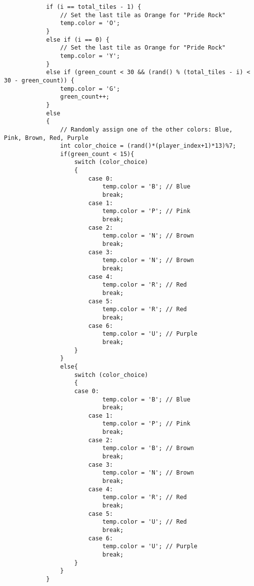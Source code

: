 \documentclass{article}
\begin{document}
\begin{verbatim}
            if (i == total_tiles - 1) {
                // Set the last tile as Orange for "Pride Rock"
                temp.color = 'O';
            } 
            else if (i == 0) {
                // Set the last tile as Orange for "Pride Rock"
                temp.color = 'Y';
            } 
            else if (green_count < 30 && (rand() % (total_tiles - i) < 30 - green_count)) {
                temp.color = 'G';
                green_count++;
            }
            else
            {
                // Randomly assign one of the other colors: Blue, Pink, Brown, Red, Purple
                int color_choice = (rand()*(player_index+1)*13)%7;
                if(green_count < 15){
                    switch (color_choice)
                    {
                        case 0:
                            temp.color = 'B'; // Blue
                            break;
                        case 1:
                            temp.color = 'P'; // Pink
                            break;
                        case 2:
                            temp.color = 'N'; // Brown
                            break;
                        case 3:
                            temp.color = 'N'; // Brown
                            break;
                        case 4:
                            temp.color = 'R'; // Red
                            break;
                        case 5:
                            temp.color = 'R'; // Red
                            break;
                        case 6:
                            temp.color = 'U'; // Purple
                            break;
                    }
                }
                else{
                    switch (color_choice)
                    {
                    case 0:
                            temp.color = 'B'; // Blue
                            break;
                        case 1:
                            temp.color = 'P'; // Pink
                            break;
                        case 2:
                            temp.color = 'B'; // Brown
                            break;
                        case 3:
                            temp.color = 'N'; // Brown
                            break;
                        case 4:
                            temp.color = 'R'; // Red
                            break;
                        case 5:
                            temp.color = 'U'; // Red
                            break;
                        case 6:
                            temp.color = 'U'; // Purple
                            break;
                    }
                }
            }
    

\end{verbatim}
\end{document}
